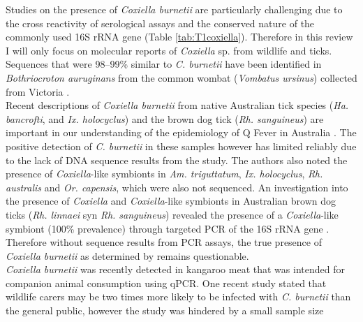 \documentclass[a4paper, nobind]{templates/ociamthesis}
\begin{document}
Studies on the presence of \emph{Coxiella burnetii} are particularly challenging due to the cross reactivity of serological assays and the conserved nature of the commonly used 16S rRNA gene (Table \ref{tab:T1coxiella}).
Therefore in this review I will only focus on molecular reports of \emph{Coxiella} sp. from wildlife and ticks.
Sequences that were 98--99\% similar to \emph{C. burnetii} have been identified in
\emph{Bothriocroton auruginans} from the common wombat (\emph{Vombatus ursinus}) collected from Victoria \autocite{vilcinsMolecularDetectionRickettsia2009,beardMorphologicalIdentificationTicks2021}.\\
Recent descriptions of \emph{Coxiella burnetii} from native Australian tick species (\emph{Ha. bancrofti}, and \emph{Ix. holocyclus}) and the brown dog tick (\emph{Rh. sanguineus}) are important in our understanding of the epidemiology of Q Fever in Australia \autocite{chaladaMolecularSurveyTickBorne2018}.
The positive detection of \emph{C. burnetii} in these samples however has limited reliably due to the lack of DNA sequence results from the study.
The authors also noted the presence of \emph{Coxiella}-like symbionts in \emph{Am. triguttatum}, \emph{Ix. holocyclus}, \emph{Rh. australis} and \emph{Or. capensis}, which were also not sequenced.
An investigation into the presence of \emph{Coxiella} and \emph{Coxiella}-like symbionts in Australian brown dog ticks (\emph{Rh. linnaei} syn \emph{Rh. sanguineus}) revealed the presence of a \emph{Coxiella}-like symbiont (100\% prevalence) through targeted PCR of the 16S rRNA gene \autocite{oskamMolecularInvestigationPresence2017}.
Therefore without sequence results from PCR assays, the true presence of \emph{Coxiella burnetii} as determined by \textcite{chaladaMolecularSurveyTickBorne2018} remains questionable.\\
\emph{Coxiella burnetii} was recently detected in kangaroo meat that was intended for companion animal consumption \autocite{shapiroMolecularDetectionCoxiella2020} using qPCR.
One recent study stated that wildlife carers may be two times more likely to be infected with \emph{C. burnetii} than the general public, however the study was hindered by a small sample size \autocite{mathewsCoxiellaBurnetiiSeroprevalence2021}
\end{document}

